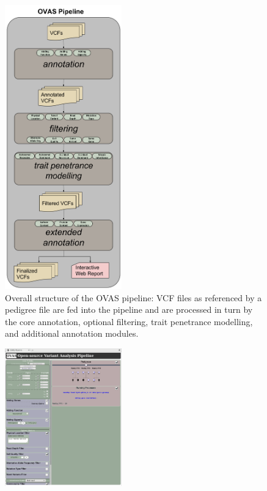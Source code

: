 \documentclass[twocolumn]{bmcart}%
\def\app{OVAS}
\begin{document}
\begin{backmatter}
%
\begin{figure}[h!]
  \centerline{\includegraphics[width=0.45\textwidth]{fig1.png}}
  \caption{\csentence{}Overall structure of the \app{} pipeline: VCF files as referenced by a pedigree file are fed into the pipeline and are processed in turn by the core annotation, optional filtering, trait penetrance modelling, and additional annotation modules. \label{fig1}}
\end{figure}
\begin{figure}[h!]
  \centerline{\includegraphics[width=0.45\textwidth]{fig2.png}}

\end{figure}
\end{backmatter}
\end{document}
